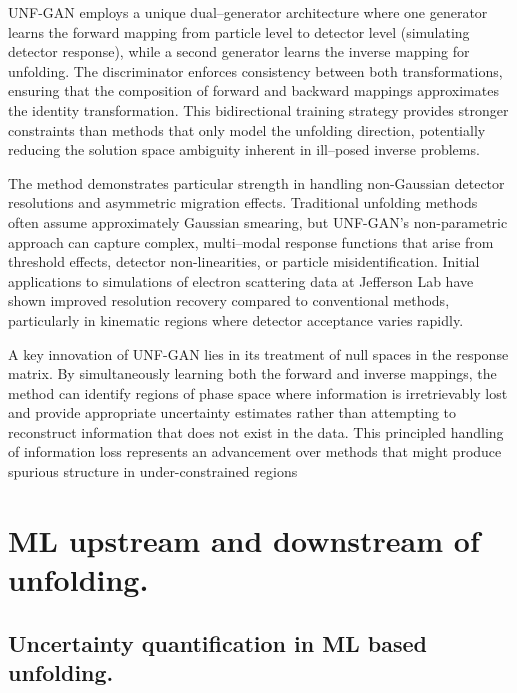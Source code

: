    UNF-GAN employs a unique dual--generator architecture where one generator learns the forward mapping from particle level to detector level (simulating detector response), while a second generator learns the inverse mapping for unfolding.
    The discriminator enforces consistency between both transformations, ensuring that the composition of forward and backward mappings approximates the identity transformation.
    This bidirectional training strategy provides stronger constraints than methods that only model the unfolding direction, potentially reducing the solution space ambiguity inherent in ill--posed inverse problems.

    The method demonstrates particular strength in handling non-Gaussian detector resolutions and asymmetric migration effects.
    Traditional unfolding methods often assume approximately Gaussian smearing, but UNF-GAN's non-parametric approach can capture complex, multi--modal response functions that arise from threshold effects, detector non-linearities, or particle misidentification.
    Initial applications to simulations of electron scattering data at Jefferson Lab have shown improved resolution recovery compared to conventional methods, particularly in kinematic regions where detector acceptance varies rapidly.
    
    A key innovation of UNF-GAN lies in its treatment of null spaces in the response matrix.
    By simultaneously learning both the forward and inverse mappings, the method can identify regions of phase space where information is irretrievably lost and provide appropriate uncertainty estimates rather than attempting to reconstruct information that does not exist in the data.
    This principled handling of information loss represents an advancement over methods that might produce spurious structure in under-constrained regions
\section{ML upstream and downstream of unfolding.}
    \subsection{Uncertainty quantification in ML based unfolding.}
    
